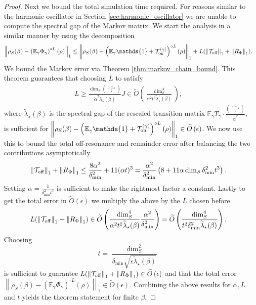 \documentclass[
 amsmath,amssymb,
 aps,
onecolumn, 
nofootinbib]{revtex4-2}
\newcommand{\on}{\rm on}
\newcommand{\off}{\rm off}
\newcommand{\norm}[1]{\left\| #1 \right\|}
\newcommand{\EE}{\mathbb{E}}
\newcommand{\TT}{\mathcal{T}}
\newcommand{\bigotilde}[1]{\widetilde{O} \left( #1 \right)}
\newcommand{\identity}{\mathds{1}}
\begin{document}
\begin{proof}
Next we bound the total simulation time required. For reasons similar to the harmonic oscillator in Section \ref{sec:harmonic_oscillator} we are unable to compute the spectral gap of the Markov matrix. We start the analysis in a similar manner by using the decomposition
\begin{equation}
    \norm{\rho_S(\beta) - \left(\EE_\gamma \Phi_\gamma\right)^{\circ L}(\rho)}_1 \le \norm{\rho_S(\beta) - \left(\EE_\gamma \identity + \TT_{\on}^{(\gamma)}\right)^{\circ L}(\rho)}_1 + L(\norm{\TT_{\off}}_1 + \norm{R_{\Phi}}_1 ).
\end{equation}
We bound the Markov error via Theorem \ref{thm:markov_chain_bound}. This theorem guarantees that choosing $L$ to satisfy
\begin{align}
    L \ge \frac{\dim_S \binom{\dim_S}{2}}{\widetilde{\alpha}^2 \widetilde{\lambda}_\star(\beta)} J \in \bigotilde{\frac{\dim_S^4}{\alpha^2 t^2 \widetilde{\lambda}_\star(\beta)}},
\end{align}
where $\widetilde{\lambda}_\star(\beta)$ is the spectral gap of the rescaled transition matrix $\EE_\gamma T_\gamma \cdot \frac{\binom{\dim_S}{2}}{\widetilde{\alpha}^2}$, is sufficient for $\norm{\rho_S(\beta) - \left(\EE_\gamma \identity + \TT_{\on}^{(\gamma)}\right)^{\circ L}(\rho)}_1 \in \bigotilde{\epsilon}$. We now use this to bound the total off-resonance and remainder error after balancing the two contributions asymptotically
\begin{align}
    \norm{\TT_{\off}}_1 + \norm{R_{\Phi}}_1 \le \frac{8\alpha^2}{\delta_{\min}^2} + 11 (\alpha t)^3 = \frac{\alpha^2}{\delta_{\min}^2} \left( 8+ 11  \alpha \dim_S \delta_{\min}^2 t^3\right).
\end{align}
Setting $\alpha = \frac{1}{\delta_{\min}^2 t^3}$ is sufficient to make the rightmost factor a constant. Lastly to get the total error in $\bigotilde{\epsilon}$ we multiply the above by the $L$ chosen before
\begin{align}
    L (\norm{\TT_{\off}}_1 + \norm{R_{\Phi}}_1) \in \bigotilde{\frac{\dim_S^4}{\alpha^2 t^2 \widetilde{\lambda}_\star(\beta)} \frac{\alpha^2}{\delta_{\min}^2}} = \bigotilde{\frac{\dim_S^4}{ t^2 \delta_{\min}^2 \widetilde{\lambda}_\star(\beta)} }.
\end{align}
Choosing
\begin{equation}
    t = \frac{\dim_S^2}{\delta_{\min} \sqrt{\epsilon \widetilde{\lambda}_\star(\beta)}} 
\end{equation}
is sufficient to guarantee $L (\norm{\TT_{\off}}_1 + \norm{R_{\Phi}}_1) \in \bigotilde{\epsilon}$ and that the total error $\norm{\rho_S(\beta) - \left( \EE_\gamma \Phi_\gamma \right)^{\circ L}(\rho)}_1 \in \bigotilde{\epsilon}$. Combining the above results for $\alpha, L$ and $t$ yields the theorem statement for finite $\beta$. 


\end{proof}
\end{document}
